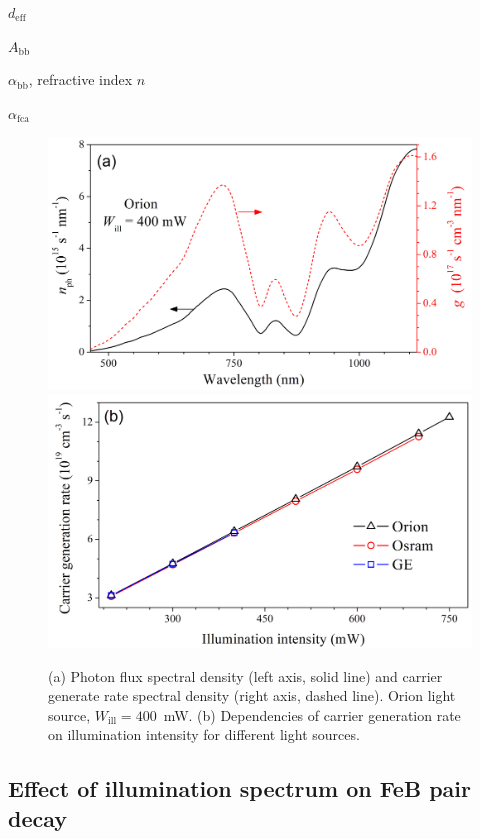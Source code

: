 \documentclass{WileyMSP-template}
\begin{document}

$d_\mathrm{eff}$ \cite{Bowden2007}

$A_\mathrm{bb}$ \cite{Schaefer2018}

$\alpha_\mathrm{bb}$, refractive index $n$ \cite{Green2022}

$\alpha_\mathrm{fca}$ \cite{SiFCA}


\begin{figure}
\centering
  \includegraphics[width=0.4\linewidth]{Fig5a.png}
  \includegraphics[width=0.4\linewidth]{Fig5b.png}
  \caption{
  (a) Photon flux spectral density (left axis, solid line) and carrier generate rate spectral density (right axis, dashed line).
  Orion light source, $W_\mathrm{ill}=400$~mW.
  (b) Dependencies of carrier generation rate on illumination intensity for different light sources.
  }
  \label{fig5}
\end{figure}




\subsection{Effect of illumination spectrum on FeB pair decay}\label{SecLast}
\end{document}
